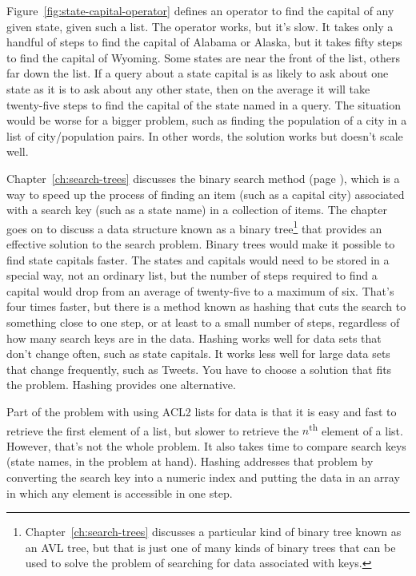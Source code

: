 Figure~\ref{fig:state-capital-operator}
defines an operator to find the
capital of any given state, given such a list.
The operator works, but it's slow.
It takes only a handful of steps to find the capital of Alabama or
Alaska, but it takes fifty steps to find the capital of Wyoming.
Some states are near the front of the list,
others far down the list.
If a query about a state capital is as likely to ask about
one state as it is to ask about any other state,
then on the average it will take twenty-five steps to find
the capital of the state named in a query.
The situation would be worse for a bigger problem,
such as finding the population of a city in a list of city/population pairs.
In other words, the solution works but doesn't scale well.

Chapter~\ref{ch:search-trees} discusses the binary search
method (page \pageref{binary-search-method}),
which is a way to speed up the process of finding an item
(such as a capital city)
associated with a search key (such as a state name) in a
collection of items. The chapter goes on to discuss
a data structure known as a
binary tree\footnote{Chapter~\ref{ch:search-trees}
discusses a particular kind of binary tree known as an AVL tree,
but that is just one of many kinds of binary trees
that can be used to solve the problem of searching
for data associated with keys.}
that provides an effective solution to the search problem.
Binary trees would make it possible to find
state capitals faster. The states and capitals would need to be stored
in a special way, not an ordinary list,
but the number of steps required to find a capital
would drop from an average of twenty-five to a maximum of six.
That's four times faster, but there is a method known as hashing
that cuts the search to something close to one step, or at least
to a small number of steps, regardless of how
many search keys are in the data.
Hashing works well for data sets that don't change often,
such as state capitals. It works less well for large
data sets that change frequently, such as Tweets.
You have to choose a solution that fits the problem.
Hashing provides one alternative.

Part of the problem with using ACL2 lists
for data is that it is easy and fast to retrieve the
first element of a list, but slower to retrieve the
$n$\textsuperscript{th} element of a list.
However, that's not the whole problem.
It also takes time to compare search keys
(state names, in the problem at hand).
Hashing addresses that problem by converting the search key
into a numeric index and putting the data
in an array in which any element is accessible
in one step.

